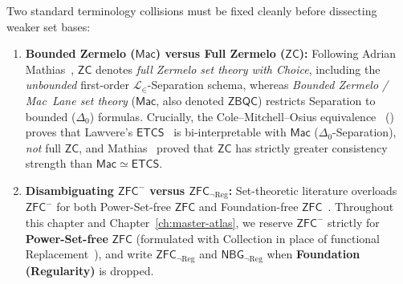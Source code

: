 \begin{remark}\label{rem:zfc-minus-notation}%
%
Two standard terminology collisions must be fixed cleanly before dissecting weaker set bases:
\begin{enumerate}[label=\textup{(\alph*)},leftmargin=1.8em]
  \item \textbf{Bounded Zermelo ($\mathsf{Mac}$) versus Full Zermelo ($\mathsf{ZC}$):} Following Adrian Mathias~\cite{Mathias01}, $\mathsf{ZC}$ denotes \emph{full Zermelo set theory with Choice}, including the \emph{unbounded} first-order $\mathcal{L}_\in$-Separation schema, whereas \emph{Bounded Zermelo / Mac~Lane set theory} ($\mathsf{Mac}$, also denoted $\mathsf{ZBQC}$) restricts Separation to bounded ($\Delta_0$) formulas. Crucially, the Cole--Mitchell--Osius equivalence~\cite{Cole73,Mitchell72,Osius74} (\cite[Ch.~VI, \S 10]{MacLaneMoerdijk92}) proves that Lawvere's $\mathsf{ETCS}$~\cite{Lawvere64} is bi-interpretable with $\mathsf{Mac}$ ($\Delta_0$-Separation), \emph{not} full $\mathsf{ZC}$, and Mathias~\cite[pp.~107--234]{Mathias01} proved that $\mathsf{ZC}$ has strictly greater consistency strength than $\mathsf{Mac} \simeq \mathsf{ETCS}$.
  \item \textbf{Disambiguating $\mathsf{ZFC}^-$ versus $\mathsf{ZFC}_{\neg\mathrm{Reg}}$:} Set-theoretic literature overloads $\mathsf{ZFC}^-$ for both Power-Set-free $\mathsf{ZFC}$ and Foundation-free $\mathsf{ZFC}$~\cite{Felgner76}. Throughout this chapter and Chapter~\ref{ch:master-atlas}, we reserve $\mathsf{ZFC}^-$ strictly for \textbf{Power-Set-free} $\mathsf{ZFC}$ (formulated with Collection in place of functional Replacement~\cite{GitmanHamkinsJohnstone16}), and write $\mathsf{ZFC}_{\neg\mathrm{Reg}}$ and $\mathsf{NBG}_{\neg\mathrm{Reg}}$ when \textbf{Foundation (Regularity)} is dropped.
\end{enumerate}
\end{remark}

